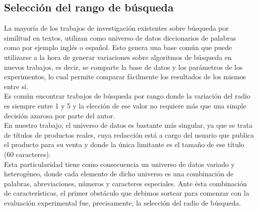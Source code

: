 

\subsection{Selecci\'on del rango de b\'usqueda}

La mayor\'ia de los trabajos de investigaci\'on existentes sobre b\'usqueda por similitud en textos, utilizan como universo de datos diccionarios de palabras como por ejemplo ingl\'es o español. Esto genera una base com\'un que puede utilizarse a la hora de generar variaciones sobre algoritmos de b\'usqueda en nuevos trabajos, es decir, se comparte la base de datos y los par\'ametros de los experimentos, lo cual permite comparar f\'acilmente los resultados de los mismos entre s\'i.\\
 
Es com\'un encontrar trabajos de b\'usqueda por rango donde la variaci\'on del radio es siempre entre 1 y 5 y la elecci\'on de ese valor no requiere m\'as que una simple decisi\'on azarosa por parte del autor.\\

En nuestro trabajo, el universo de datos es bastante m\'as singular, ya que se trata de t\'itulos de productos reales, cuya redacci\'on est\'a a cargo del usuario que publica el producto para su venta y donde la \'unica limitante es el tama\~no de ese t\'itulo (60 caracteres).\\

Esta particularidad tiene como consecuencia un universo de datos variado y heterog\'eneo, donde cada elemento de dicho universo es una combinaci\'on de palabras, abreviaciones, n\'umeros y caracteres especiales. Ante \'esta combinaci\'on de caracter\'isticas, el primer obst\'aculo que debimos sortear para comenzar con la evaluaci\'on experimental fue, precisamente, la selecci\'on del radio de b\'usqueda.\\

